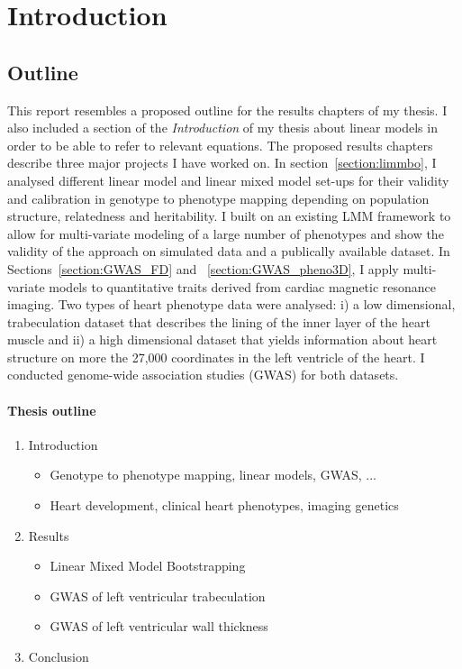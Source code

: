 \section{Introduction}

\subsection{Outline}
This report resembles a proposed outline for the results chapters of my thesis. I also included a section of the \emph{Introduction} of my thesis about linear models in order to be able to refer to relevant equations. The proposed results chapters describe three major projects I have worked on. In section~\ref{section:limmbo}, I analysed different linear model and linear mixed model set-ups for their validity and calibration in genotype to phenotype mapping depending on population structure, relatedness and heritability. I built on an existing LMM framework to allow for multi-variate modeling of a large number of phenotypes and show the validity of the approach on simulated data and a publically available dataset. In Sections~\ref{section:GWAS_FD} and ~\ref{section:GWAS_pheno3D}, I apply multi-variate models to quantitative traits derived from cardiac magnetic resonance imaging. Two types of heart phenotype data were analysed: i) a low dimensional, trabeculation dataset that describes the lining of the inner layer of the heart muscle and ii) a high dimensional dataset that yields information about heart structure on more the 27,000 coordinates in the left ventricle of the heart. I conducted genome-wide association studies (GWAS) for both datasets.

\paragraph{Thesis outline}
\begin{enumerate}
	\item Introduction
	\begin{itemize}
		\item Genotype to phenotype mapping, linear models, GWAS, ...
		\item Heart development, clinical heart phenotypes, imaging genetics
	\end{itemize}
	\item Results
	\begin{itemize}
		\item Linear Mixed Model Bootstrapping
		\item GWAS of left ventricular trabeculation
		\item GWAS of left ventricular wall thickness
	\end{itemize}
	\item Conclusion
\end{enumerate}

